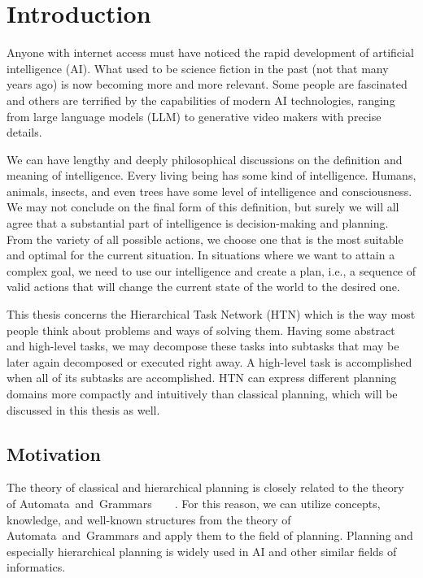 \chapter*{Introduction}

\noindent
Anyone with internet access must have noticed the rapid development of artificial intelligence (AI). What used to be science fiction in the past (not that many years ago) is now becoming more and more relevant. Some people are fascinated and others are terrified by the capabilities of modern AI technologies, ranging from large language models (LLM) to generative video makers with precise details.

\medskip\noindent
We can have lengthy and deeply philosophical discussions on the definition and meaning of intelligence. Every living being has some kind of intelligence. Humans, animals, insects, and even trees have some level of intelligence and consciousness. We may not conclude on the final form of this definition, but surely we will all agree that a substantial part of intelligence is decision-making and planning. From the variety of all possible actions, we choose one that is the most suitable and optimal for the current situation. In situations where we want to attain a complex goal, we need to use our intelligence and create a plan, i.e., a sequence of valid actions that will change the current state of the world to the desired one.

\medskip\noindent
This thesis concerns the Hierarchical Task Network (HTN) which is the way most people think about problems and ways of solving them. Having some abstract and high-level tasks, we may decompose these tasks into subtasks that may be later again decomposed or executed right away. A high-level task is accomplished when all of its subtasks are accomplished. HTN can express different planning domains more compactly and intuitively than classical planning, which will be discussed in this thesis as well.

\section*{Motivation}

\noindent
The theory of classical and hierarchical planning is closely related to the theory of Automata~and~Grammars~\cite{chytil}~\cite{complexity}~\cite{langclassification}~\cite{cmyk}. For this reason, we can utilize concepts, knowledge, and well-known structures from the theory of Automata~and~Grammars and apply them to the field of planning. Planning and especially hierarchical planning is widely used in AI and other similar fields of informatics.

